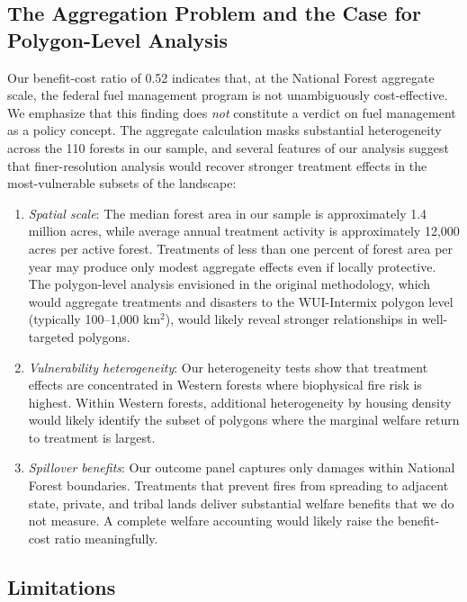 \documentclass[12pt, letterpaper]{article}
\begin{document}
\subsection{The Aggregation Problem and the Case for Polygon-Level Analysis}

Our benefit-cost ratio of 0.52 indicates that, at the National Forest aggregate scale, the federal fuel management program is not unambiguously cost-effective. We emphasize that this finding does \textit{not} constitute a verdict on fuel management as a policy concept. The aggregate calculation masks substantial heterogeneity across the 110 forests in our sample, and several features of our analysis suggest that finer-resolution analysis would recover stronger treatment effects in the most-vulnerable subsets of the landscape:

\begin{enumerate}[leftmargin=*, itemsep=0.2em]
\item \textit{Spatial scale}: The median forest area in our sample is approximately 1.4 million acres, while average annual treatment activity is approximately 12{,}000 acres per active forest. Treatments of less than one percent of forest area per year may produce only modest aggregate effects even if locally protective. The polygon-level analysis envisioned in the original methodology, which would aggregate treatments and disasters to the WUI-Intermix polygon level (typically 100--1{,}000 km$^2$), would likely reveal stronger relationships in well-targeted polygons.
\item \textit{Vulnerability heterogeneity}: Our heterogeneity tests show that treatment effects are concentrated in Western forests where biophysical fire risk is highest. Within Western forests, additional heterogeneity by housing density would likely identify the subset of polygons where the marginal welfare return to treatment is largest.
\item \textit{Spillover benefits}: Our outcome panel captures only damages within National Forest boundaries. Treatments that prevent fires from spreading to adjacent state, private, and tribal lands deliver substantial welfare benefits that we do not measure. A complete welfare accounting would likely raise the benefit-cost ratio meaningfully.
\end{enumerate}

\subsection{Limitations}
\end{document}
